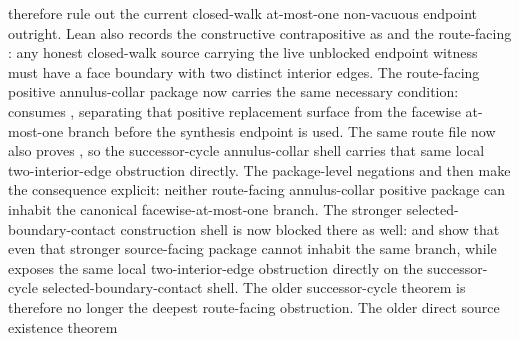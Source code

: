 \documentclass[11pt]{article}
\begin{document}
\begin{itemize}
therefore rule out the current closed-walk at-most-one non-vacuous endpoint
outright.  Lean also records the constructive contrapositive as
and the route-facing
:
any honest closed-walk source carrying the live unblocked endpoint witness must
have a face boundary with two distinct interior edges.  The route-facing
positive annulus-collar package now carries the same necessary condition:
consumes
, separating
that positive replacement surface from the facewise at-most-one branch before
the synthesis endpoint is used.  The same route file now also proves
,
so the successor-cycle annulus-collar shell carries that same local
two-interior-edge obstruction directly.  The package-level negations
and
then make the consequence explicit: neither route-facing annulus-collar
positive package can inhabit the canonical facewise-at-most-one branch.  The
stronger selected-boundary-contact construction shell is now blocked there as
well:
and
show that even that stronger source-facing package cannot inhabit the same
branch, while
exposes the same local two-interior-edge obstruction directly on the
successor-cycle selected-boundary-contact shell.  The older successor-cycle theorem
is therefore no longer the deepest route-facing obstruction.
The older direct source existence theorem

\end{itemize}
\end{document}
